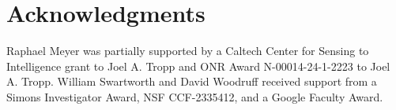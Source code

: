 
\section*{Acknowledgments}

Raphael Meyer was partially supported by a Caltech Center for Sensing to Intelligence grant to Joel A. Tropp and ONR Award N-00014-24-1-2223 to Joel A. Tropp. William Swartworth and David Woodruff received support from a Simons Investigator Award, NSF CCF-2335412, and a Google Faculty Award.